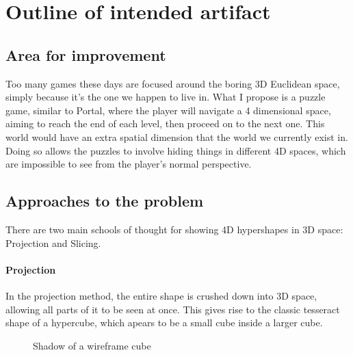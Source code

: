 \documentclass[12pt]{article}
\begin{document}
\maketitle

\section{Outline of intended artifact}
\subsection{Area for improvement}
Too many games these days are focused around the boring 3D Euclidean space, simply because it's the one we happen to live in.
What I propose is a puzzle game, similar to Portal, where the player will navigate a 4 dimensional space, aiming to reach the end of each level, then proceed on to the next one.
This world would have an extra spatial dimension that the world we currently exist in. 
Doing so allows the puzzles to involve hiding things in different 4D spaces, which are impossible to see from the player's normal perspective.

\subsection{Approaches to the problem}
There are two main schools of thought for showing 4D hypershapes in 3D space: Projection and Slicing. 
\paragraph{Projection}
In the projection method, the entire shape is crushed down into 3D space, allowing all parts of it to be seen at once. 
This gives rise to the classic tesseract shape of a hypercube, which apears to be a small cube inside a larger cube. \\

\begin{figure}
    \centering
    \caption{Shadow of a wireframe cube} \label{fig:CubeProjection}
\end{figure}
\end{document}
